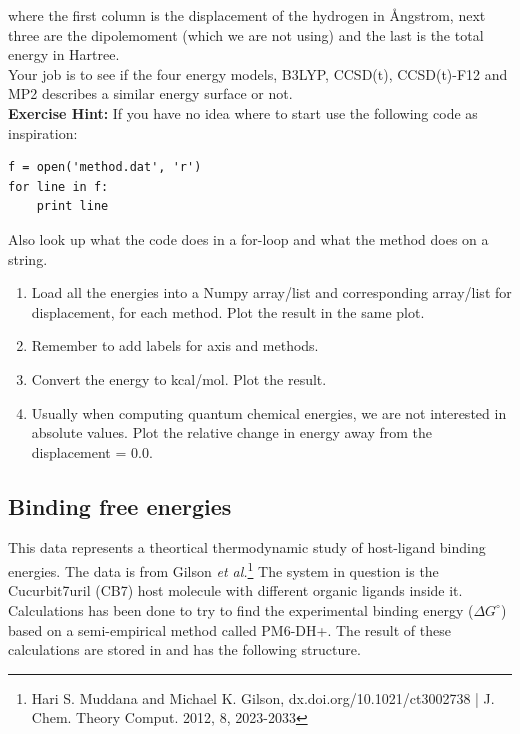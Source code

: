 \documentclass{article}
\begin{document}
where the first column is the displacement of the hydrogen in \AA ngstrom, next three are the dipolemoment (which we are not using) and the last is the total energy in Hartree.\\

Your job is to see if the four energy models, B3LYP, CCSD(t), CCSD(t)-F12 and MP2 describes a similar energy surface or not.\\

{\bf Exercise Hint:}
If you have no idea where to start use the following code as inspiration:

\begin{lstlisting}
f = open('method.dat', 'r')
for line in f:
    print line

\end{lstlisting}

Also look up what the code  does in a for-loop and what the method  does on a string.

\begin{enumerate}

    \item Load all the energies into a Numpy array/list and corresponding array/list for displacement,
          for each method.
          Plot the result in the same plot.

    \item Remember to add labels for axis and methods.

    \item Convert the energy to kcal/mol.
          Plot the result.

    \item Usually when computing quantum chemical energies, we are not interested in absolute values.
          Plot the relative change in energy away from the displacement = 0.0.

\end{enumerate}


\newpage
\subsection{Binding free energies}

This data represents a theortical thermodynamic study of host-ligand binding energies.
The data is from Gilson {\em et al.}\footnote{Hari S. Muddana and Michael K. Gilson, dx.doi.org/10.1021/ct3002738 | J. Chem. Theory Comput. 2012, 8, 2023-2033}
The system in question is the Cucurbit7uril (CB7) host molecule with different organic ligands inside it.
Calculations has been done to try to find the experimental binding energy ($\Delta G^\circ$) based on a semi-empirical method called PM6-DH+.
The result of these calculations are stored in  and has the following structure.
\end{document}
